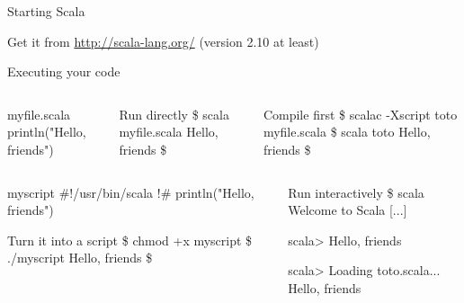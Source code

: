 \begin{frame}[fragile]{Starting Scala}
  
   Get it from \url{http://scala-lang.org/} (version 2.10 at least)
  \smallskip

  \begin{block}{Executing your code}
    \begin{columns}
      \begin{column}{.28\linewidth}
        \begin{boitecode}{myfile.scala}
println("Hello, friends")

        \end{boitecode}
      \end{column}
      \begin{column}{.22\linewidth}
        \begin{boiteshell}{Run directly}
\$ scala myfile.scala          
Hello, friends
\$
        \end{boiteshell}
      \end{column}
      \begin{column}{.38\linewidth}
        \begin{boiteshell}{Compile first}
\$ scalac -Xscript toto myfile.scala          
\$ scala toto
Hello, friends
\$      \end{boiteshell}
      \end{column}
    \end{columns}
    \begin{columns}
      \begin{column}{.3\linewidth}
        \begin{boitecode}{myscript}
#!/usr/bin/scala
!#
println("Hello, friends")
        \end{boitecode}
        \begin{boiteshell}{Turn it into a script}
\$ chmod +x myscript
\$ ./myscript
Hello, friends
\$      \end{boiteshell}
      \end{column}
      \begin{column}{.4\linewidth}
        \begin{boiteshell}{Run interactively}
\$ scala
Welcome to Scala [...]

scala> 
Hello, friends

scala> 
Loading toto.scala...
Hello, friends
        \end{boiteshell}
      \end{column}

    \end{columns}
  \end{block}
\end{frame}
